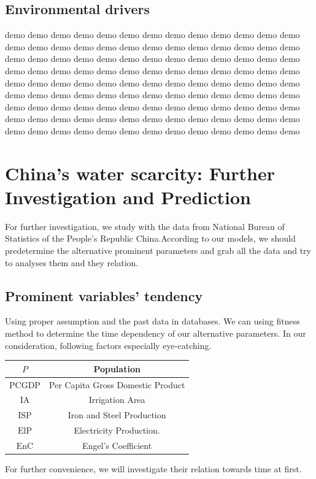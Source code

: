   \subsection{Environmental drivers}
  demo demo demo demo demo demo demo demo demo demo demo demo demo demo demo demo demo demo demo demo demo demo demo demo demo demo demo demo demo demo demo demo demo demo demo demo demo demo demo demo demo demo demo demo demo demo demo demo demo demo demo demo demo demo demo demo demo demo demo demo demo demo demo demo demo demo demo demo demo demo demo demo demo demo demo demo demo demo demo demo demo demo demo demo demo demo demo demo demo demo demo demo demo demo demo demo demo demo demo demo demo demo demo demo demo demo demo demo demo demo demo demo demo demo demo demo demo

\section{China's water scarcity: Further Investigation and Prediction}

  For further investigation, we study with the data from National Bureau of Statistics of the People's Republic China\cite{ChinaDataBase}.According to our models, we should predetermine the alternative prominent parameters and grab all the data and try to analyses them and they relation.
  \subsection{Prominent variables' tendency}
  Using proper assumption and the past data in databases. We can using fitness method to determine the time dependency of our alternative parameters.
  In our consideration, following factors especially eye-catching.
  \begin{table}[!h]
  \centering
  \begin{tabular}{|c|c|}
  \hline
  $P$ & Population \\
  \hline
  $\text{PCGDP}$ & Per Capita Gross Domestic Product \\
  \hline
  $\text{IA}$ & Irrigation Area \\
  \hline
  $\text{ISP}$ & Iron and Steel Production \\
  \hline
  $\text{ElP}$ & Electricity Production. \\
  \hline
  $\text{EnC}$ & Engel's Coefficient \\
  \hline
  \end{tabular}
  \end{table}
  For further convenience, we will investigate their relation towards time at first.
